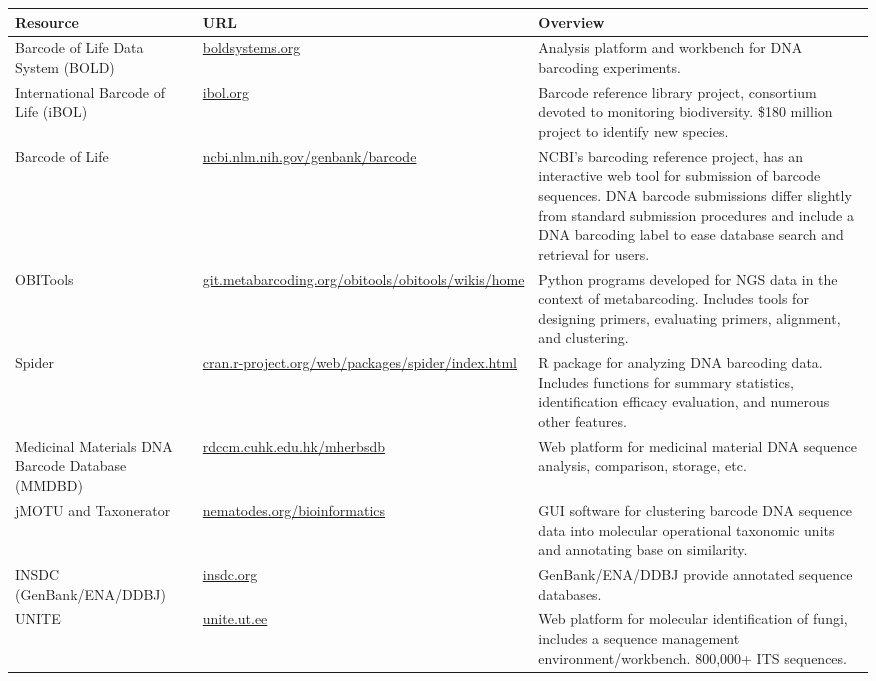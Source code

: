 \documentclass[letterpaper,10pt,hidelinks]{article}
\begin{document}
\begin{table}[h]
	\centering
	\begin{tabular}{p{4cm} p{4cm} p{7cm}}
		\toprule
		{\textbf{Resource}} & {\textbf{URL}} & {\textbf{Overview}} \\
		\midrule
		{Barcode of Life Data System (BOLD)} & {\url{boldsystems.org}} & {Analysis platform and workbench for 
		DNA barcoding experiments.} \\  \midrule
		{International Barcode of Life (iBOL)} & {\url{ibol.org}} & {Barcode reference library project, consortium 
		devoted to monitoring biodiversity. \$180 million project to identify new species.} \\ \midrule
		{Barcode of Life} & {\url{ncbi.nlm.nih.gov/genbank/barcode}} & {NCBI's barcoding reference project, has an 
		interactive web tool for submission of barcode sequences. DNA barcode submissions differ slightly 
		from standard submission procedures and include a DNA barcoding label to ease database search and 
		retrieval for users.} \\ \midrule
		{OBITools} & {\url{git.metabarcoding.org/obitools/obitools/wikis/home}} & {Python programs developed for 
		NGS data in the context of metabarcoding. Includes tools for designing primers, evaluating primers, 
		alignment, and clustering.} \\ \midrule
		{Spider} & {\url{cran.r-project.org/web/packages/spider/index.html}} & {R package for analyzing DNA 
		barcoding data. Includes functions for summary statistics, identification efficacy evaluation, and numerous 
		other features.} \\ \midrule
		{Medicinal Materials DNA Barcode Database (MMDBD)} & {\url{rdccm.cuhk.edu.hk/mherbsdb}} & {Web platform 
		for medicinal material DNA sequence analysis, comparison, storage, etc.} \\ \midrule
		{jMOTU and Taxonerator} & {\url{nematodes.org/bioinformatics}} & {GUI software for clustering barcode DNA 
		sequence data into molecular operational taxonomic units and annotating base on similarity.} \\
		\midrule
		{INSDC (GenBank/ENA/DDBJ)} & {\url{insdc.org}} & {GenBank/ENA/DDBJ provide annotated sequence databases.} \\
		\midrule
		{UNITE} & {\url{unite.ut.ee}} & {Web platform for molecular identification of fungi, includes a sequence 
		management environment/workbench. 800,000+ ITS sequences.} \\

\end{tabular}
\end{table}
\end{document}

